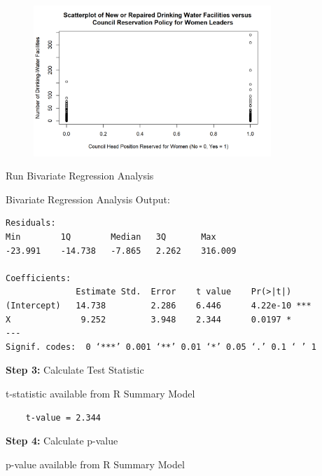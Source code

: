 \documentclass[12pt,letterpaper]{article}
\begin{document}
\begin{figure}[H]
	\centering
	\includegraphics[width=0.8\textwidth]{Figure_2_1.png}
\end{figure}

\noindent Run Bivariate Regression Analysis 


\newpage
\noindent Bivariate Regression Analysis Output:
\begin{verbatim}
Residuals:
Min        1Q        Median   3Q       Max 
-23.991    -14.738   -7.865   2.262    316.009 

Coefficients:
              Estimate Std.  Error    t value    Pr(>|t|)    
(Intercept)   14.738         2.286    6.446      4.22e-10 ***
X              9.252         3.948    2.344      0.0197 *  
---
Signif. codes:  0 ‘***’ 0.001 ‘**’ 0.01 ‘*’ 0.05 ‘.’ 0.1 ‘ ’ 1
\end{verbatim}
\vspace{.5cm}
\noindent\textbf{Step 3:} Calculate Test Statistic

\noindent t-statistic available from R Summary Model

\begin{verbatim}
	t-value = 2.344
\end{verbatim}
\vspace{.5cm}
\noindent\textbf{Step 4:} Calculate p-value

\noindent p-value available from R Summary Model
\end{document}
